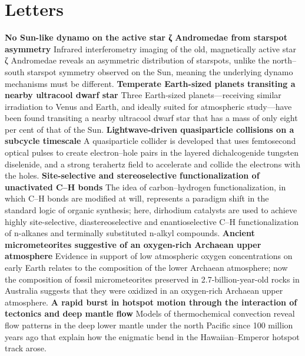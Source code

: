 \documentclass[a4j]{jsarticle}
\begin{document}
\section{Letters}
\noindent\textbf{No Sun-like dynamo on the active star ζ Andromedae from starspot asymmetry}
Infrared interferometry imaging of the old, magnetically active star ζ Andromedae reveals an asymmetric distribution of starspots, unlike the north–south starspot symmetry observed on the Sun, meaning the underlying dynamo mechanisms must be different.
\vspace{3mm}
\noindent\textbf{Temperate Earth-sized planets transiting a nearby ultracool dwarf star}
Three Earth-sized planets—receiving similar irradiation to Venus and Earth, and ideally suited for atmospheric study—have been found transiting a nearby ultracool dwarf star that has a mass of only eight per cent of that of the Sun.
\vspace{3mm}
\noindent\textbf{Lightwave-driven quasiparticle collisions on a subcycle timescale}
A quasiparticle collider is developed that uses femtosecond optical pulses to create electron–hole pairs in the layered dichalcogenide tungsten diselenide, and a strong terahertz field to accelerate and collide the electrons with the holes.
\vspace{3mm}
\noindent\textbf{Site-selective and stereoselective functionalization of unactivated C–H bonds}
The idea of carbon–hydrogen functionalization, in which C–H bonds are modified at will, represents a paradigm shift in the standard logic of organic synthesis; here, dirhodium catalysts are used to achieve highly site-selective, diastereoselective and enantioselective C–H functionalization of n-alkanes and terminally substituted n-alkyl compounds.
\vspace{3mm}
\noindent\textbf{Ancient micrometeorites suggestive of an oxygen-rich Archaean upper atmosphere}
Evidence in support of low atmospheric oxygen concentrations on early Earth relates to the composition of the lower Archaean atmosphere; now the composition of fossil micrometeorites preserved in 2.7-billion-year-old rocks in Australia suggests that they were oxidized in an oxygen-rich Archaean upper atmosphere.
\vspace{3mm}
\noindent\textbf{A rapid burst in hotspot motion through the interaction of tectonics and deep mantle flow}
Models of thermochemical convection reveal flow patterns in the deep lower mantle under the north Pacific since 100 million years ago that explain how the enigmatic bend in the Hawaiian–Emperor hotspot track arose.
\end{document}
